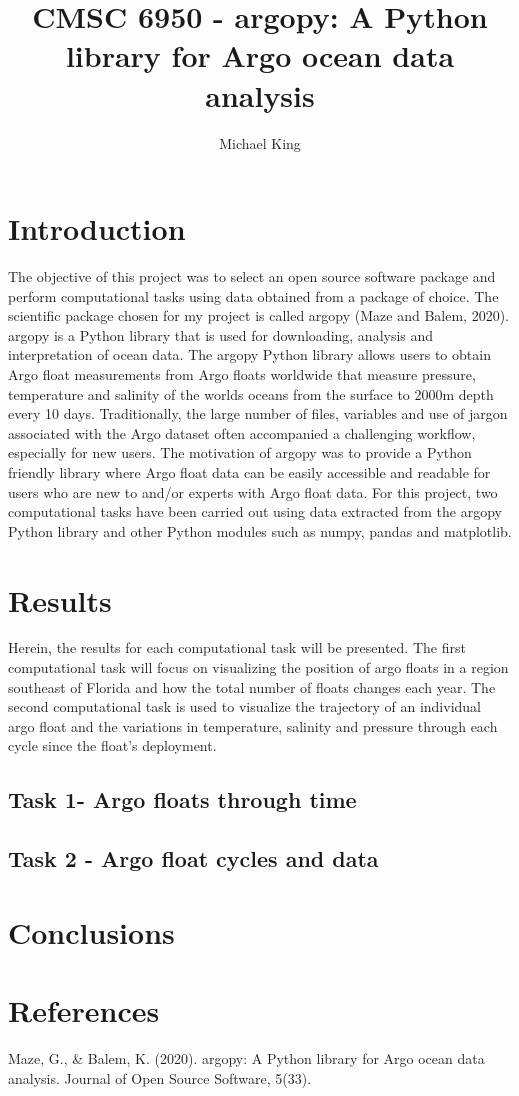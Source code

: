 \documentclass{article}
\title{CMSC 6950 - argopy: A Python library for Argo ocean data analysis}
\author{Michael King}
\begin{document}
\maketitle

\section{Introduction}

The objective of this project was to select an open source software package and perform computational tasks using data obtained from a package of choice. The scientific package chosen for my project is called argopy (Maze and Balem, 2020). argopy is a Python library that is used for downloading, analysis and interpretation of ocean data. The argopy Python library allows users to obtain Argo float measurements from Argo floats worldwide that measure pressure, temperature and salinity of the worlds oceans from the surface to 2000m depth every 10 days. Traditionally, the large number of files, variables and use of jargon associated with the Argo dataset often accompanied a challenging workflow, especially for new users. The motivation of argopy was to provide a Python friendly library where Argo float data can be easily accessible and readable for users who are new to and/or experts with Argo float data. For this project, two computational tasks have been carried out using data extracted from the argopy Python library and other Python modules such as numpy, pandas and matplotlib. 

    

\section{Results}

Herein, the results for each computational task will be presented. The first computational task will focus on visualizing the position of argo floats in a region southeast of Florida and how the total number of floats changes each year. The second computational task is used to visualize the trajectory of an individual argo float and the variations in temperature, salinity and pressure through each cycle since the float's deployment.

\subsection{Task 1- Argo floats through time}

\subsection{Task 2 - Argo float cycles and data}

\section{Conclusions}

\section{References}

Maze, G., & Balem, K. (2020). argopy: A Python library for Argo ocean data analysis. Journal of Open Source Software, 5(33).
\end{document}
